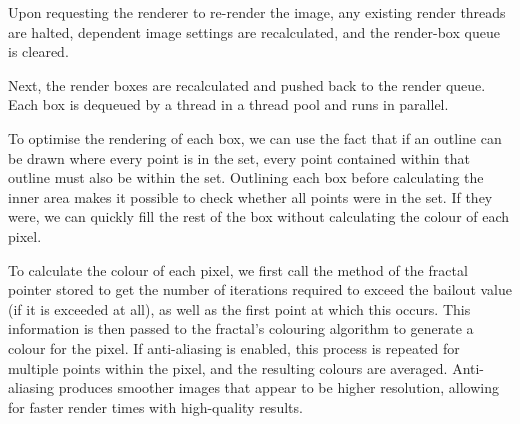 \begin{center}
\end{center}

Upon requesting the renderer to re-render the image, any existing render threads are halted, dependent image settings are recalculated, and the render-box queue is cleared.

Next, the render boxes are recalculated and pushed back to the render queue. Each box is dequeued by a thread in a thread pool and runs in parallel.

To optimise the rendering of each box, we can use the fact that if an outline can be drawn where every point is in the set, every point contained within that outline must also be within the set. Outlining each box before calculating the inner area makes it possible to check whether all points were in the set. If they were, we can quickly fill the rest of the box without calculating the colour of each pixel.

To calculate the colour of each pixel, we first call the  method of the fractal pointer stored to get the number of iterations required to exceed the bailout value (if it is exceeded at all), as well as the first point at which this occurs. This information is then passed to the fractal's colouring algorithm to generate a colour for the pixel. If anti-aliasing is enabled, this process is repeated for multiple points within the pixel, and the resulting colours are averaged. Anti-aliasing produces smoother images that appear to be higher resolution, allowing for faster render times with high-quality results.

